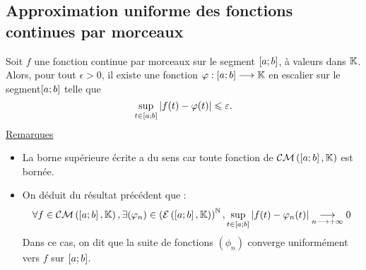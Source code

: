 \subsection{Approximation uniforme des fonctions continues par morceaux}
\begin{defprop}
    Soit \(f\) une fonction continue par morceaux sur le segment \(\left[a;b\right]\), à valeurs dans \(\mathbb{K}\). \\
    Alors, pour tout \(\epsilon  > 0\), il existe une fonction \(\varphi : \left[a;b\right] \longrightarrow \mathbb{K}\) en escalier sur le segment\( \left[a;b\right]\) telle que 
    \[\sup_{t\in \left[a;b\right]} \left\lvert f (t) -  \varphi(t)\right\rvert \leqslant \varepsilon .\]
    \underline{Remarques} \\
    \begin{itemize}
        \item La borne supérieure écrite a du sens car toute fonction de \(\mathcal{CM} \left(\left[a;b\right], \mathbb{K}\right)\) est bornée.
        \item On déduit du résultat précédent que :
            \[\forall f \in  \mathcal{CM} \left(\left[a;b\right], \mathbb{K}\right) , \exists  (\varphi_n) \in  \left(\mathcal{E} \left(\left[a;b\right] , \mathbb{K}\right)\right)^{\mathbb{N}} , \sup_{t\in \left[a;b\right]} \left\lvert f (t) -  \varphi_n(t)\right\rvert \underset{n \longrightarrow +\infty}{\longrightarrow} 0\]
        Dans ce cas, on dit que la suite de fonctions \((\phi_n)\) converge uniformément vers \(f\) sur \(\left[a;b\right]\).
    \end{itemize}
\end{defprop}
